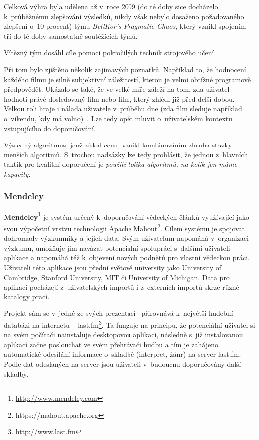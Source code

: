 \documentclass[thesis=M,czech]{FITthesis}[2014/05/07]
\begin{document}
Celková výhra byla udělena až v~roce 2009 (do té doby sice docházelo k~průběžnému zlepšování výsledků, nikdy však nebylo dosaženo požadovaného zlepšení o~10 procent) týmu \emph{BellKor's Pragmatic Chaos}, který vznikl spojením tří do té doby samostatně soutěžících týmů.

Vítězný tým dosáhl cíle pomocí pokročilých technik strojového učení.

Při tom bylo zjištěno několik zajímavých poznatků. Například to, že hodnocení každého filmu je silně subjektivní záležitostí, kterou je velmi obtížné programově předpovědět. Ukázalo se také, že ve velké míře záleží na tom, zda uživatel hodnotí právě dosledovaný film nebo film, který zhlédl již před delší dobou. Velkou roli hraje i nálada uživatele v~průběhu dne (zda film sleduje například o~víkendu, kdy má volno)~\cite{bellkor}. Lze tedy opět mluvit o~uživatelském kontextu vstupujícího do doporučování.

Výsledný algoritmus, jenž získal cenu, vznikl kombinováním zhruba stovky menších algoritmů. S~trochou nadsázky lze tedy prohlásit, že jednou z~hlavních taktik pro kvalitní doporučení je \emph{použití tolika algoritmů, na kolik jen máme kapacity}.

\subsubsection{Mendeley}	
\label{mendeley}
\textbf{Mendeley}\footnote{\url{http://www.mendeley.com}} je systém určený k~doporučování vědeckých článků využívající jako svou výpočetní vrstvu technologii Apache Mahout\footnote{https://mahout.apache.org}. Cílem systému je spojovat dohromady výzkumníky a jejich data. Svým uživatelům napomáhá v~organizaci výzkumu, umožňuje jim navázat potenciální spolupráci s~dalšími uživateli aplikace a napomáhá též k~objevení nových podnětů pro vlastní vědeckou práci. Uživateli této aplikace jsou přední světové university jako University of Cambridge, Stanford University, MIT či University of Michigan. Data pro aplikaci pocházejí z~uživatelských importů i z~externích importů skrze různé katalogy prací. 

Projekt sám se v~jedné ze svých prezentací~\cite{mendeleylastfm} přirovnává k~největší hudební databázi na internetu – last.fm\footnote{http://www.last.fm}. Ta funguje na principu, že potenciální uživatel si na svém počítači nainstaluje desktopovou aplikaci, následně s~již instalovanou aplikací začne poslouchat ve svém přehrávači hudbu a tím je zahájeno automatické odesílání informace o~skladbě (interpret, žánr) na server last.fm. Podle dat odeslaných na server jsou uživateli v~budoucnu doporučovány další skladby. 
\end{document}
